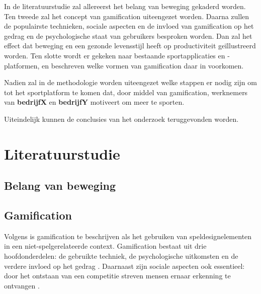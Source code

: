 In de literatuurstudie zal allereerst het belang van beweging gekaderd worden. Ten tweede zal het concept van gamification uiteengezet worden. Daarna zullen de populairste technieken, sociale aspecten en de invloed van gamification op het gedrag en de psychologische staat van gebruikers besproken worden. Dan zal het effect dat beweging en een gezonde levensstijl heeft op productiviteit geïllustreerd worden. Ten slotte wordt er gekeken naar bestaande sportapplicaties en -platformen, en beschreven welke vormen van gamification daar in voorkomen.

Nadien zal in de methodologie worden uiteengezet welke stappen er nodig zijn om tot het sportplatform te komen dat, door middel van gamification, werknemers van \textbf{bedrijfX} en \textbf{bedrijfY} motiveert om meer te sporten.

Uiteindelijk kunnen de conclusies van het onderzoek teruggevonden worden.





\section{Literatuurstudie}%
\label{sec:state-of-the-art}

\subsection{Belang van beweging}

\subsection{Gamification}

Volgens \textcite{Deterding2011} is gamification te beschrijven als het gebruiken van speldesignelementen in een niet-spelgerelateerde context. Gamification bestaat uit drie hoofdonderdelen: de gebruikte techniek, de psychologische uitkomsten en de verdere invloed op het gedrag \autocite{Hamari2014}. Daarnaast zijn sociale aspecten ook essentieel: door het ontstaan van een competitie streven mensen ernaar erkenning te ontvangen \autocite{Hamari2013}.


